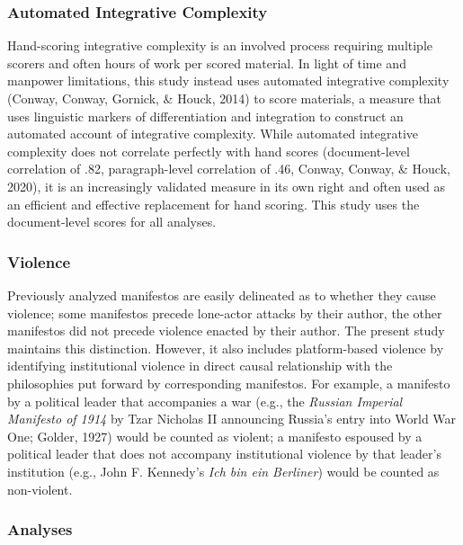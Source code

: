 \documentclass[
  english,
  man,floatsintext]{apa6}
\begin{document}
\subsubsection{Automated Integrative Complexity}\label{automated-integrative-complexity}

Hand-scoring integrative complexity is an involved
process requiring multiple scorers and often hours of work per scored material. In light of
time and manpower limitations, this study instead uses automated integrative complexity
(Conway, Conway, Gornick, \& Houck, 2014) to score materials, a measure that uses linguistic markers of
differentiation and integration to construct an automated account of integrative complexity.
While automated integrative complexity does not correlate perfectly with hand scores
(document-level correlation of .82, paragraph-level correlation of .46, Conway, Conway, \& Houck, 2020), it is an increasingly validated measure in its own right and often used as an
efficient and effective replacement for hand scoring. This study uses the document-level
scores for all analyses.\\

\subsubsection{Violence}\label{violence}

Previously analyzed manifestos are easily delineated as to whether they cause
violence; some manifestos precede lone-actor attacks by their author, the other manifestos
did not precede violence enacted by their author. The present study maintains this
distinction. However, it also includes platform-based violence by identifying institutional
violence in direct causal relationship with the philosophies put forward by corresponding
manifestos. For example, a manifesto by a political leader that accompanies a war (e.g., the
\emph{Russian Imperial Manifesto of 1914} by Tzar Nicholas II announcing Russia's entry into World
War One; Golder, 1927) would be counted as violent; a manifesto espoused by a political
leader that does not accompany institutional violence by that leader's institution (e.g.,
John F. Kennedy's \emph{Ich bin ein Berliner}) would be counted as non-violent.

\subsubsection{Analyses}\label{analyses}
\end{document}
